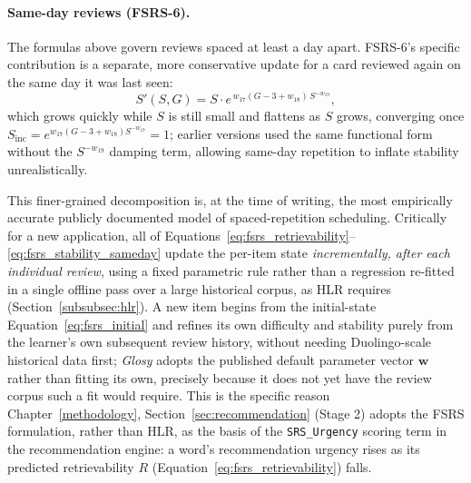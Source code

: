         \paragraph{Same-day reviews (FSRS-6).} The formulas above govern reviews spaced at least a day apart. FSRS-6's specific contribution is a separate, more conservative update for a card reviewed again on the same day it was last seen:
        \begin{equation}
            \label{eq:fsrs_stability_sameday}
            S'(S, G) = S \cdot e^{\,w_{17}(G - 3 + w_{18}) \, S^{-w_{19}}},
        \end{equation}
        which grows quickly while $S$ is still small and flattens as $S$ grows, converging once $S_{\mathrm{inc}} = e^{w_{17}(G-3+w_{18})S^{-w_{19}}} = 1$; earlier versions used the same functional form without the $S^{-w_{19}}$ damping term, allowing same-day repetition to inflate stability unrealistically.

        This finer-grained decomposition is, at the time of writing, the most empirically accurate publicly documented model of spaced-repetition scheduling. Critically for a new application, all of Equations~\ref{eq:fsrs_retrievability}--\ref{eq:fsrs_stability_sameday} update the per-item state \emph{incrementally, after each individual review}, using a fixed parametric rule rather than a regression re-fitted in a single offline pass over a large historical corpus, as HLR requires (Section~\ref{subsubsec:hlr}). A new item begins from the initial-state Equation~\ref{eq:fsrs_initial} and refines its own difficulty and stability purely from the learner's own subsequent review history, without needing Duolingo-scale historical data first; \textit{Glosy} adopts the published default parameter vector $\mathbf{w}$ rather than fitting its own, precisely because it does not yet have the review corpus such a fit would require. This is the specific reason Chapter~\ref{methodology}, Section~\ref{sec:recommendation} (Stage 2) adopts the FSRS formulation, rather than HLR, as the basis of the \texttt{SRS\_Urgency} scoring term in the recommendation engine: a word's recommendation urgency rises as its predicted retrievability $R$ (Equation~\ref{eq:fsrs_retrievability}) falls.

